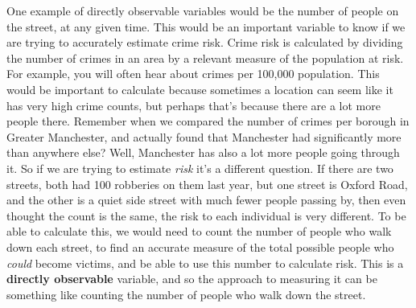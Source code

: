 \documentclass[
]{book}
\begin{document}
One example of directly observable variables would be the number of people on the street, at any given time. This would be an important variable to know if we are trying to accurately estimate crime risk. Crime risk is calculated by dividing the number of crimes in an area by a relevant measure of the population at risk. For example, you will often hear about crimes per 100,000 population. This would be important to calculate because sometimes a location can seem like it has very high crime counts, but perhaps that's because there are a lot more people there. Remember when we compared the number of crimes per borough in Greater Manchester, and actually found that Manchester had significantly more than anywhere else? Well, Manchester has also a lot more people going through it. So if we are trying to estimate \emph{risk} it's a different question. If there are two streets, both had 100 robberies on them last year, but one street is Oxford Road, and the other is a quiet side street with much fewer people passing by, then even thought the count is the same, the risk to each individual is very different. To be able to calculate this, we would need to count the number of people who walk down each street, to find an accurate measure of the total possible people who \emph{could} become victims, and be able to use this number to calculate risk. This is a \textbf{directly observable} variable, and so the approach to measuring it can be something like counting the number of people who walk down the street.
\end{document}
